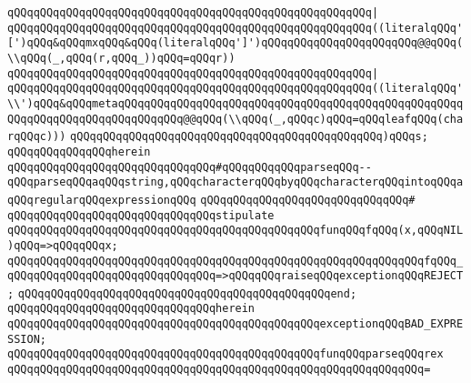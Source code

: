\verb|qQQqqQQqqQQqqQQqqQQqqQQqqQQqqQQqqQQqqQQqqQQqqQQqqQQqqQQq|\verb#|#\newline
\verb|qQQqqQQqqQQqqQQqqQQqqQQqqQQqqQQqqQQqqQQqqQQqqQQqqQQqqQQq((literalqQQq'[')qQQq&qQQqmxqQQq&qQQq(literalqQQq']')qQQqqQQqqQQqqQQqqQQqqQQq@@qQQq(\\qQQq(_,qQQq(r,qQQq_))qQQq=qQQqr))|\newline
\verb|qQQqqQQqqQQqqQQqqQQqqQQqqQQqqQQqqQQqqQQqqQQqqQQqqQQqqQQq|\verb#|#\newline
\verb|qQQqqQQqqQQqqQQqqQQqqQQqqQQqqQQqqQQqqQQqqQQqqQQqqQQqqQQq((literalqQQq'\\')qQQq&qQQqmetaqQQqqQQqqQQqqQQqqQQqqQQqqQQqqQQqqQQqqQQqqQQqqQQqqQQqqQQqqQQqqQQqqQQqqQQqqQQqqQQq@@qQQq(\\qQQq(_,qQQqc)qQQq=qQQqleafqQQq(charqQQqc)))|\newline
\verb|qQQqqQQqqQQqqQQqqQQqqQQqqQQqqQQqqQQqqQQqqQQqqQQq)qQQqs;|\newline
\newline
\verb|qQQqqQQqqQQqqQQqherein|\newline
\newline
\verb|qQQqqQQqqQQqqQQqqQQqqQQqqQQqqQQq#qQQqqQQqqQQqparseqQQq--qQQqparseqQQqaqQQqstring,qQQqcharacterqQQqbyqQQqcharacterqQQqintoqQQqaqQQqregularqQQqexpressionqQQq|\newline
\verb|qQQqqQQqqQQqqQQqqQQqqQQqqQQqqQQq#|\newline
\verb|qQQqqQQqqQQqqQQqqQQqqQQqqQQqqQQqstipulate|\newline
\newline
\verb|qQQqqQQqqQQqqQQqqQQqqQQqqQQqqQQqqQQqqQQqqQQqqQQqfunqQQqfqQQq(x,qQQqNIL)qQQq=>qQQqqQQqx;|\newline
\verb|qQQqqQQqqQQqqQQqqQQqqQQqqQQqqQQqqQQqqQQqqQQqqQQqqQQqqQQqqQQqqQQqfqQQq_qQQqqQQqqQQqqQQqqQQqqQQqqQQqqQQq=>qQQqqQQqraiseqQQqexceptionqQQqREJECT;|\newline
\verb|qQQqqQQqqQQqqQQqqQQqqQQqqQQqqQQqqQQqqQQqqQQqqQQqend;|\newline
\newline
\verb|qQQqqQQqqQQqqQQqqQQqqQQqqQQqqQQqherein|\newline
\newline
\verb|qQQqqQQqqQQqqQQqqQQqqQQqqQQqqQQqqQQqqQQqqQQqqQQqexceptionqQQqBAD_EXPRESSION;|\newline
\newline
\verb|qQQqqQQqqQQqqQQqqQQqqQQqqQQqqQQqqQQqqQQqqQQqqQQqfunqQQqparseqQQqrex|\newline
\verb|qQQqqQQqqQQqqQQqqQQqqQQqqQQqqQQqqQQqqQQqqQQqqQQqqQQqqQQqqQQqqQQq=|\newline
